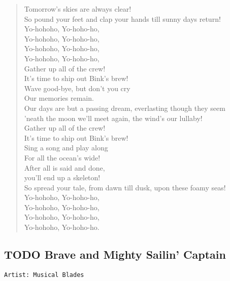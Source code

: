 \documentclass[11pt]{article}
\begin{document}
\begin{verse}
Tomorrow's skies are always clear!\\
So pound your feet and clap your hands till sunny days return!\\
\vspace*{1em}
Yo-hohoho, Yo-hoho-ho,\\
Yo-hohoho, Yo-hoho-ho,\\
Yo-hohoho, Yo-hoho-ho,\\
Yo-hohoho, Yo-hoho-ho,\\
Gather up all of the crew!\\
It's time to ship out Bink's brew!\\
Wave good-bye, but don't you cry\\
Our memories remain.\\
Our days are but a passing dream, everlasting though they seem\\
'neath the moon we'll meet again, the wind's our lullaby!\\
Gather up all of the crew!\\
It's time to ship out Bink's brew!\\
Sing a song and play along\\
For all the ocean's wide!\\
After all is said and done,\\
you'll end up a skeleton!\\
So spread your tale, from dawn till dusk, upon these foamy seas!\\
Yo-hohoho, Yo-hoho-ho,\\
Yo-hohoho, Yo-hoho-ho,\\
Yo-hohoho, Yo-hoho-ho,\\
Yo-hohoho, Yo-hoho-ho.\\
\end{verse}
\clearpage
\subsection{{\bfseries\sffamily TODO} Brave and Mighty Sailin' Captain}
\label{sec:orga02da74}
\begin{verbatim}
Artist: Musical Blades
\end{verbatim}

\clearpage
\end{document}
